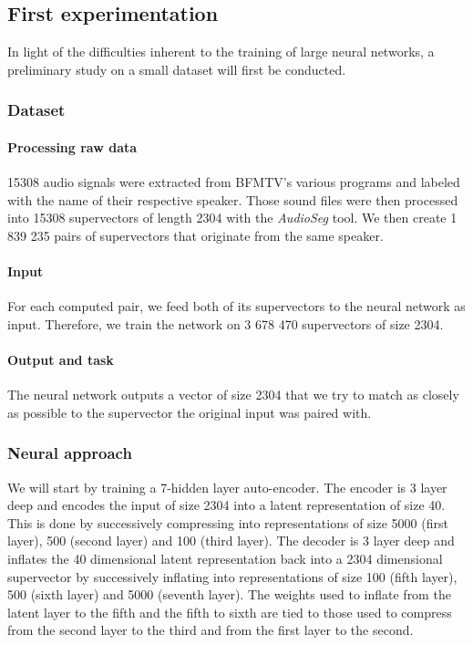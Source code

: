 \documentclass[conference]{IEEEtran}
\begin{document}
\subsection{First experimentation}

In light of the difficulties inherent to the training of large neural networks,
a preliminary study on a small dataset will first be conducted.

\subsubsection{Dataset}

\paragraph{Processing raw data}

15308 audio signals were extracted from BFMTV's various programs and labeled
with the name of their respective speaker. Those sound files were then processed
into 15308 supervectors of length 2304 with the \emph{AudioSeg} tool.
We then create 1 839 235 pairs of supervectors that originate from the same
speaker.

\paragraph{Input}

For each computed pair, we feed both of its supervectors to the neural network as
input. Therefore, we train the network on 3 678 470 supervectors of size 2304.

\paragraph{Output and task}

The neural network outputs a vector of size 2304 that we try to match as closely
as possible to the supervector the original input was paired with.

\subsubsection{Neural approach}
We will start by training a 7-hidden layer auto-encoder.
The encoder is 3 layer
deep and encodes the input of size 2304 into a latent representation of size 40.
This is done by successively compressing into representations of size 5000
(first layer), 500 (second layer) and 100 (third layer).
The decoder is 3 layer deep and inflates the 40 dimensional latent
representation back into a 2304 dimensional supervector by successively
inflating into representations of size 100 (fifth layer), 500 (sixth layer) and
5000 (seventh layer). The weights used to inflate from the latent layer to the
fifth and the fifth to sixth are tied to those used to compress from the second
layer to the third and from the first
layer to the second.
\end{document}

